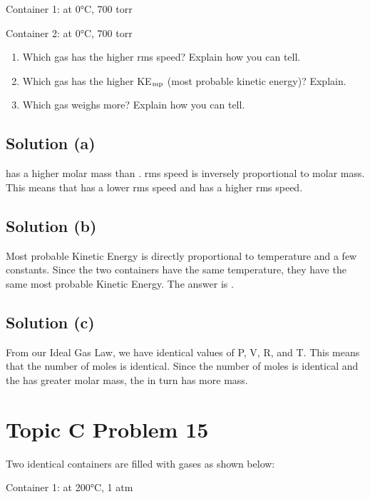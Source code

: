 \documentclass[10pt]{article}
\begin{document}
        Container 1:  at 0\unit{\celsius}, 700 torr
        
        Container 2:  at 0\unit{\celsius}, 700 torr
        \begin{enumerate} [label=\alph*)]
            \item Which gas has the higher rms speed? Explain how you can tell.
            \item Which gas has the higher KE$_{\rm mp}$ (most probable kinetic energy)? Explain.
            \item Which gas weighs more? Explain how you can tell.
        \end{enumerate}

        \subsection{Solution (a)}
             has a higher molar mass than . 
            rms speed is inversely proportional to molar mass.
            This means that  has a lower rms speed and  has a higher rms speed.

        \subsection{Solution (b)}
            Most probable Kinetic Energy is directly proportional to temperature and a few constants. 
            Since the two containers have the same temperature, they have the same most probable Kinetic Energy. 
            The answer is . 

        \subsection{Solution (c)}
            From our Ideal Gas Law, we have identical values of P, V, R, and T. 
            This means that the number of moles is identical. 
            Since the number of moles is identical and the  has greater molar mass, the  in turn has more mass. 

    \pagebreak
    \section{Topic C Problem 15}
        Two identical containers are filled with gases as shown below:
        
        Container 1:  at 200\unit{\celsius}, 1 atm 
        
\end{document}
